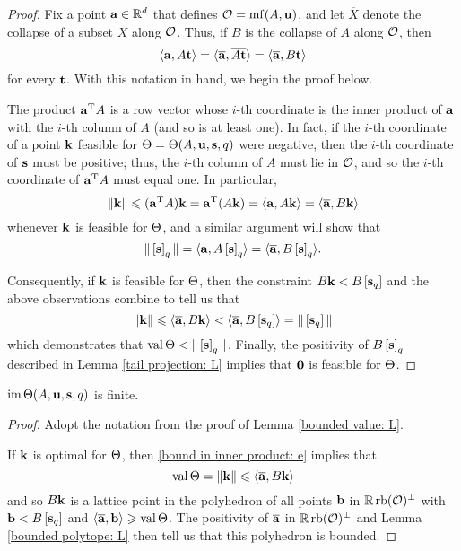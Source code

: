 \documentclass[11pt]{amsart}
\renewcommand{\!}[1]{{\color{red}\text{$\star$\,}#1\,$\star$}}
\newcommand{\ol}[1]{\overline{#1}}
\begin{document}
\begin{proof}   
Fix a point $\mathbf{a} \in \mathbb{R}^d$ that defines $\mathcal{O}  = \operatorname{mf}(A, \mathbf{u})$, and let $\ol{X}$ denote the collapse of a subset $X$ along $\mathcal{O}$.  Thus, if $B$ is the collapse of $A$ along $\mathcal{O}$, then
\[ \iprod{{\vv{a}}}{A \vv{t}} = \iprod{\ol{\vv{a}}}{\ol{A \vv{t}}} = \iprod{\ol{\vv{a}}}{B \vv{t}} \] for every $\mathbf{t}$.  With this notation in hand, we begin the proof below.

The product $\mathbf{a}^{\mathrm{T}} A $ is a row vector whose $i$-th coordinate is the inner product of $\mathbf{a}$ with the $i$-th column of $A$ (and so is at least one).   In fact, if the $i$-th coordinate of a point $\mathbf{k}$ feasible for $\Theta = \Theta(A, \mathbf{u}, \mathbf{s}, q)$ were negative, then the $i$-th coordinate of $\mathbf{s}$ must be positive;  thus, the $i$-th column of $A$ must lie in $\mathcal{O}$, and so the $i$-th coordinate of $\mathbf{a}^{\mathrm{T}} A$ must equal one.  In particular, 
%
\begin{equation} 
\label{bound in inner product: e}
\norm{\vv{k}} \leq (\vv{a}^{\mathrm{T}} A) \vv{k} =  \vv{a}^{\mathrm{T}} (A \vv{k}) = \iprod{\vv{a}}{A \vv{k}} = \iprod{\ol{\vv{a}}}{B \vv{k}} 
\end{equation}
whenever $\mathbf{k}$ is feasible for $\Theta$, and a similar argument will show that 
\begin{equation}  
\label{norm of tail: e}
\norm{\tail{\vv{s}}_q} =  \iprod{\vv{a}}{A \tail{\vv{s}}_q} = \iprod{\ol{\vv{a}}}{B \tail{\vv{s}}_q}.
\end{equation}

Consequently, if $\mathbf{k}$ is feasible for $\Theta$, then the constraint $B\mathbf{k} <B \left[ \mathbf{s}_q \right]$ and the above observations combine to tell us that \[ \norm{\vv{k}} \leq \iprod{\ol{\vv{a}}}{B \vv{k}} < \iprod{\ol{\vv{a}}}{B \tail{\vv{s}_q}} = \norm{\tail{\vv{s}_q}}\] 
which demonstrates that $\operatorname{val} \Theta < \| \left[ \mathbf{s} \right]_q \|$.  Finally, the positivity of $B\left[ \mathbf{s} \right]_q$ described in Lemma \ref{tail projection: L} implies that $\mathbf{0}$ is feasible for $\Theta$.
\end{proof}


\begin{corollary}
\label{finite image: C}
$\operatorname{im} \Theta(A, \mathbf{u}, \mathbf{s}, q)$ is finite.
\end{corollary}

\begin{proof}  Adopt the notation from the proof of Lemma \ref{bounded value: L}.

If $\mathbf{k}$ is optimal for $\Theta$, then \eqref{bound in inner product: e} implies that \[ \val \ip = \norm{\vv{k}} \leq \iprod{\ol{\vv{a}}}{B \vv{k}}\] and so $B \mathbf{k}$ is a lattice point in the polyhedron of all points $\mathbf{b}$  in $\mathbb{R} \operatorname{rb}(\mathcal{O})^{\perp}$ with $\mathbf{b} < B \left[ \mathbf{s}_q \right]$  and $\iprod{\ol{\vv{a}}}{\vv{b}} \geq \val \ip$.  The positivity of $\ol{\vv{a}}$ in $\mathbb{R} \operatorname{rb}(\mathcal{O})^{\perp}$ and Lemma \ref{bounded polytope: L} then tell us  that this polyhedron is bounded.  
\end{proof}
\end{document}
